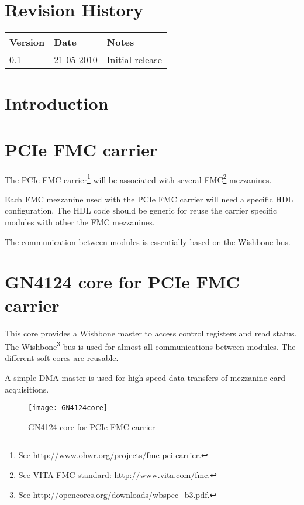 \documentclass[10pt,a4paper]{cerndoc}
\begin{document}
  \cerntitle
  \section*{Revision History}
  \begin{tabularx}{\textwidth}{|p{3cm}|p{3cm}|X|}
    \hline \textbf{Version}&\textbf{Date}&\textbf{Notes}\\ \hline \hline
    0.1 & 21-05-2010 & Initial release\\ \hline

  \end{tabularx}

  \tableofcontents
  \listoffigures
  \clearpage

  \section*{Introduction}

  \section{PCIe FMC carrier}
The PCIe FMC carrier\footnote{See \href{http://www.ohwr.org/projects/fmc-pci-carrier}{http://www.ohwr.org/projects/fmc-pci-carrier}.} will be associated with several FMC\footnote{See VITA FMC standard: \href{http://www.vita.com/fmc}{http://www.vita.com/fmc}.} mezzanines. 

Each FMC mezzanine used with the PCIe FMC carrier will need a specific HDL configuration. The HDL code should be generic for reuse the carrier specific modules with other the FMC mezzanines. 

 The communication between modules is essentially based on the Wishbone bus.




  \section{GN4124 core for PCIe FMC carrier}
  This core provides a Wishbone master to access control registers and read status.  The Wishbone\footnote{See \href{http://opencores.org/downloads/wbspec\_b3.pdf}{http://opencores.org/downloads/wbspec\_b3.pdf}.} bus is used for almost all communications between modules. The different soft cores are reusable.
  
  A simple DMA master is used for high speed data transfers of mezzanine card acquisitions.
  
\begin{figure}[!ht]
	\centering
		\texttt{[image: GN4124core]}
	\caption{GN4124 core for PCIe FMC carrier}
	\label{fig:GCWWM}
\end{figure} 
\end{document}
